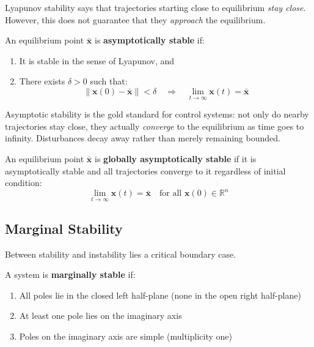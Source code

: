 Lyapunov stability says that trajectories starting close to equilibrium \textit{stay close}. However, this does not guarantee that they \textit{approach} the equilibrium.

\begin{definition}
\label{def:asymptotic_stability}
An equilibrium point $\bar{\mathbf{x}}$ is \textbf{asymptotically stable} if:
\begin{enumerate}
    \item It is stable in the sense of Lyapunov, and
    \item There exists $\delta > 0$ such that:
    \begin{equation}
    \|\mathbf{x}(0) - \bar{\mathbf{x}}\| < \delta \quad \Rightarrow \quad \lim_{t \to \infty} \mathbf{x}(t) = \bar{\mathbf{x}}
    \end{equation}
\end{enumerate}
\end{definition}

Asymptotic stability is the gold standard for control systems: not only do nearby trajectories stay close, they actually \textit{converge} to the equilibrium as time goes to infinity. Disturbances decay away rather than merely remaining bounded.

\begin{definition}
\label{def:gas}
An equilibrium point $\bar{\mathbf{x}}$ is \textbf{globally asymptotically stable} if it is asymptotically stable and all trajectories converge to it regardless of initial condition:
\begin{equation}
\lim_{t \to \infty} \mathbf{x}(t) = \bar{\mathbf{x}} \quad \text{for all } \mathbf{x}(0) \in \mathbb{R}^n
\end{equation}
\end{definition}

\subsection{Marginal Stability}

Between stability and instability lies a critical boundary case.

\begin{definition}
\label{def:marginal_stability}
A system is \textbf{marginally stable} if:
\begin{enumerate}
    \item All poles lie in the closed left half-plane (none in the open right half-plane)
    \item At least one pole lies on the imaginary axis
    \item Poles on the imaginary axis are simple (multiplicity one)
\end{enumerate}
\end{definition}


